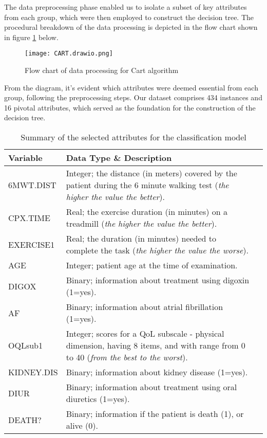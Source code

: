 The data preprocessing phase enabled us to isolate a subset of key attributes from each group, which were then employed to construct the decision tree. The procedural breakdown of the data processing is depicted in the flow chart shown in figure \ref{fig:flow chart of data processing} below.

\begin{figure}[H]
    \centering
    \texttt{[image: CART.drawio.png]}
    \caption{Flow chart of data processing for Cart algorithm}
    \label{fig:flow chart of data processing}
\end{figure}

From the diagram, it's evident which attributes were deemed essential from each group, following the preprocessing steps. Our dataset comprises 
434 instances and 16 pivotal attributes, which served as the foundation for the construction of the decision tree.

\begin{table}[H]
  \centering
  \caption{Summary of the selected attributes for the classification model}
  \begin{tabular}{|p{2.5cm}|p{10cm}|p{2.3cm}|}
  \hline
  \textbf{Variable} & \textbf{Data Type \& Description} \\ \hline
  6MWT.DIST & 
  Integer; the distance (in meters) covered by the patient during the 6 minute walking test (\textit{the higher the value the better}).     
  \\
  CPX.TIME           & 
  Real; the exercise duration (in minutes) on a treadmill (\textit{the higher the value the better}). 
  \\
  EXERCISE1 &
  Real; the duration (in minutes) needed to complete the task (\textit{the higher the value the worse}).
  \\
  AGE                & 
  Integer; patient age at the time of examination.
  \\
  DIGOX              & 
  Binary; information about treatment using digoxin (1=yes).      
  \\
  AF                 &
  Binary; information about atrial fibrillation (1=yes).
  \\
  OQLsub1   &
  Integer; scores for a QoL subscale - physical dimension, having 8 items, and with range from 0 to 40 (\textit{from the best to the worst}).
  \\
  KIDNEY.DIS         & 
  Binary; information about kidney disease (1=yes).
  \\
  DIUR               & 
  Binary; information about treatment using oral diuretics (1=yes).                
  \\
  DEATH?             & 
  Binary; information if the patient is death (1), or alive (0).
  \\ 
  \hline
  \end{tabular}
\end{table}


